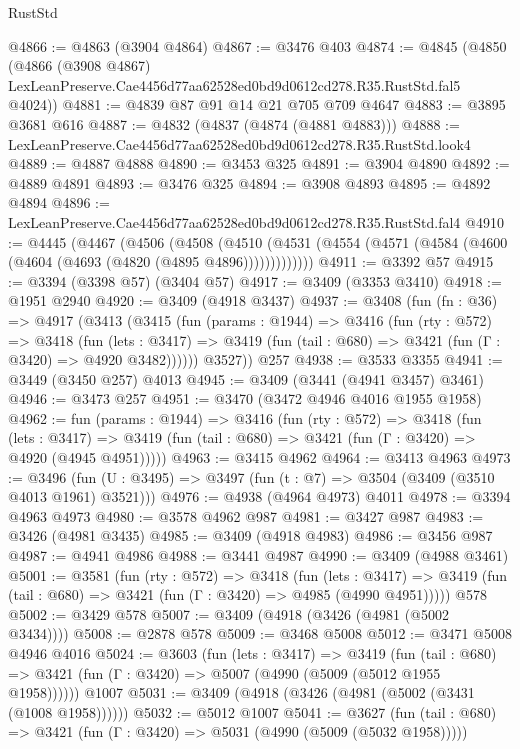\begin{lexlean}{RustStd}
\begin{coremodule}
@4866 := @4863 (@3904 @4864)
@4867 := @3476 @403
@4874 := @4845
    (@4850
      (@4866
        (@3908 @4867)
        LexLeanPreserve.Cae4456d77aa62528ed0bd9d0612cd278.R35.RustStd.fal5
        @4024))
@4881 := @4839 @87 @91 @14 @21 @705 @709 @4647
@4883 := @3895 @3681 @616
@4887 := @4832 (@4837 (@4874 (@4881 @4883)))
@4888 := LexLeanPreserve.Cae4456d77aa62528ed0bd9d0612cd278.R35.RustStd.look4
@4889 := @4887 @4888
@4890 := @3453 @325
@4891 := @3904 @4890
@4892 := @4889 @4891
@4893 := @3476 @325
@4894 := @3908 @4893
@4895 := @4892 @4894
@4896 := LexLeanPreserve.Cae4456d77aa62528ed0bd9d0612cd278.R35.RustStd.fal4
@4910 := @4445
    (@4467
      (@4506
        (@4508
          (@4510 (@4531 (@4554 (@4571 (@4584 (@4600 (@4604 (@4693 (@4820 (@4895 @4896)))))))))))))
@4911 := @3392 @57
@4915 := @3394 (@3398 @57) (@3404 @57)
@4917 := @3409 (@3353 @3410)
@4918 := @1951 @2940
@4920 := @3409 (@4918 @3437)
@4937 := @3408
    (fun (fn : @36) =>
    @4917
      (@3413
        (@3415
          (fun (params : @1944) =>
          @3416
            (fun (rty : @572) =>
            @3418
              (fun (lets : @3417) =>
              @3419 (fun (tail : @680) => @3421 (fun (Γ : @3420) => @4920 @3482))))))
        @3527))
    @257
@4938 := @3533 @3355
@4941 := @3449 (@3450 @257) @4013
@4945 := @3409 (@3441 (@4941 @3457) @3461)
@4946 := @3473 @257
@4951 := @3470 (@3472 @4946 @4016 @1955 @1958)
@4962 := fun (params : @1944) =>
  @3416
    (fun (rty : @572) =>
    @3418
      (fun (lets : @3417) =>
      @3419 (fun (tail : @680) => @3421 (fun (Γ : @3420) => @4920 (@4945 @4951)))))
@4963 := @3415 @4962
@4964 := @3413 @4963
@4973 := @3496 (fun (U : @3495) => @3497 (fun (t : @7) => @3504 (@3409 (@3510 @4013 @1961) @3521)))
@4976 := @4938 (@4964 @4973) @4011
@4978 := @3394 @4963 @4973
@4980 := @3578 @4962 @987
@4981 := @3427 @987
@4983 := @3426 (@4981 @3435)
@4985 := @3409 (@4918 @4983)
@4986 := @3456 @987
@4987 := @4941 @4986
@4988 := @3441 @4987
@4990 := @3409 (@4988 @3461)
@5001 := @3581
    (fun (rty : @572) =>
    @3418
      (fun (lets : @3417) =>
      @3419 (fun (tail : @680) => @3421 (fun (Γ : @3420) => @4985 (@4990 @4951)))))
    @578
@5002 := @3429 @578
@5007 := @3409 (@4918 (@3426 (@4981 (@5002 @3434))))
@5008 := @2878 @578
@5009 := @3468 @5008
@5012 := @3471 @5008 @4946 @4016
@5024 := @3603
    (fun (lets : @3417) =>
    @3419
      (fun (tail : @680) => @3421 (fun (Γ : @3420) => @5007 (@4990 (@5009 (@5012 @1955 @1958))))))
    @1007
@5031 := @3409 (@4918 (@3426 (@4981 (@5002 (@3431 (@1008 @1958))))))
@5032 := @5012 @1007
@5041 := @3627
    (fun (tail : @680) => @3421 (fun (Γ : @3420) => @5031 (@4990 (@5009 (@5032 @1958)))))

\end{coremodule}
\end{lexlean}
